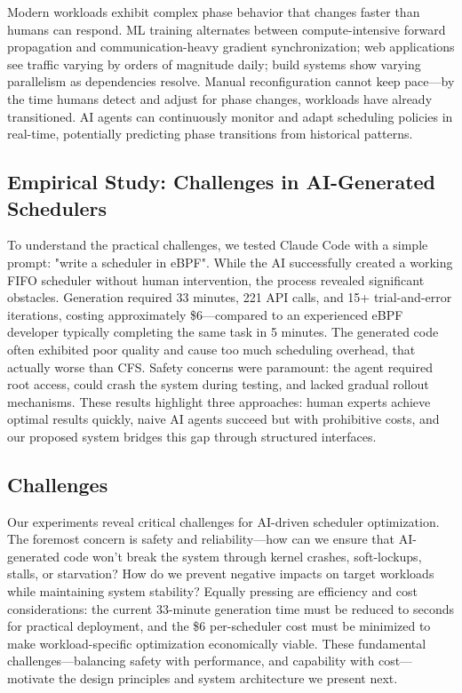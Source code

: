Modern workloads exhibit complex phase behavior that changes faster than humans can respond. ML training alternates between compute-intensive forward propagation and communication-heavy gradient synchronization; web applications see traffic varying by orders of magnitude daily; build systems show varying parallelism as dependencies resolve. Manual reconfiguration cannot keep pace—by the time humans detect and adjust for phase changes, workloads have already transitioned. AI agents can continuously monitor and adapt scheduling policies in real-time, potentially predicting phase transitions from historical patterns.

\subsection{Empirical Study: Challenges in AI-Generated Schedulers}

To understand the practical challenges, we tested Claude Code with a simple prompt: "write a scheduler in eBPF". While the AI successfully created a working FIFO scheduler without human intervention, the process revealed significant obstacles. Generation required 33 minutes, 221 API calls, and 15+ trial-and-error iterations, costing approximately \$6—compared to an experienced eBPF developer typically completing the same task in 5 minutes. The generated code often exhibited poor quality and cause too much scheduling overhead, that actually worse than CFS. Safety concerns were paramount: the agent required root access, could crash the system during testing, and lacked gradual rollout mechanisms. These results highlight three approaches: human experts achieve optimal results quickly, naive AI agents succeed but with prohibitive costs, and our proposed system bridges this gap through structured interfaces.

\subsection{Challenges}

Our experiments reveal critical challenges for AI-driven scheduler optimization. The foremost concern is safety and reliability—how can we ensure that AI-generated code won't break the system through kernel crashes, soft-lockups, stalls, or starvation? How do we prevent negative impacts on target workloads while maintaining system stability? Equally pressing are efficiency and cost considerations: the current 33-minute generation time must be reduced to seconds for practical deployment, and the \$6 per-scheduler cost must be minimized to make workload-specific optimization economically viable. These fundamental challenges—balancing safety with performance, and capability with cost—motivate the design principles and system architecture we present next.